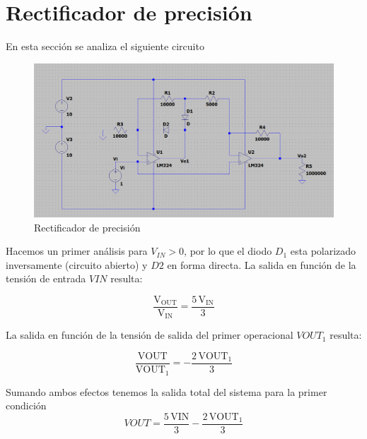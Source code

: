 \documentclass[12pt]{article}
\begin{document}
		
	\section{Rectificador de precisión}
	En esta sección se analiza el siguiente circuito
	\begin{figure}[h]
		\centering
		\includegraphics[width=1\linewidth]{Simulaciones-Resultados/Circuito3_esquematico}
		\caption{Rectificador de precisión}
		\label{fig:circuito3esquematico}
	\end{figure}
		
	Hacemos un primer análisis para $V_{IN}>0$, por lo que el diodo $D_1$
	esta polarizado inversamente (circuito abierto) y $D2$ en forma directa. La salida en 
	función de la tensión de entrada $VIN$ resulta:
	
	\begin{equation}
		\frac{\mathrm{V_{OUT}}}{\mathrm{V_{IN}}}=\frac{5\,\mathrm{V_{IN}}}{3}
	\end{equation}
	
	La salida en función de la tensión de salida del primer operacional $VOUT_1$ resulta:
	
	\begin{equation}
		\frac{\mathrm{VOUT}}{{\textrm{VOUT}}_1 }=-\frac{2\,{\textrm{VOUT}}_1 }{3}
	\end{equation}
	
	Sumando ambos efectos tenemos la salida total del sistema para la primer condición
	\begin{equation}
		{VOUT}=\frac{5\,\mathrm{VIN}}{3}-\frac{2\,{\textrm{VOUT}}_1 }{3}
	\end{equation}
	
\end{document}
